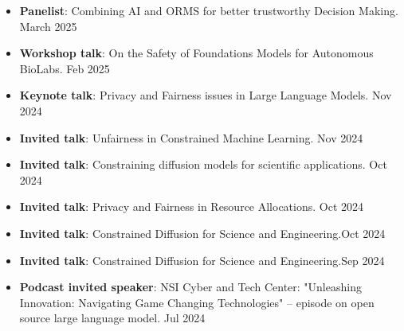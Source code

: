 
\vspace{6pt}
\begin{itemize}
  \item {\bf Panelist}: Combining AI and ORMS for better trustworthy Decision Making.
  \hfill {March 2025}\\

  \item {\bf Workshop talk}: On the Safety of Foundations Models for Autonomous BioLabs.
  \hfill {Feb 2025}\\

  \item {\bf Keynote talk}: Privacy and Fairness issues in Large Language Models.
  \hfill {Nov 2024}\\

  \item {\bf Invited talk}: Unfairness in Constrained Machine Learning.
  \hfill {Nov 2024}\\

  \item {\bf Invited talk}: Constraining diffusion models for scientific applications.
  \hfill {Oct 2024}\\

  \item {\bf Invited talk}: Privacy and Fairness in Resource Allocations. \hfill{Oct 2024}\\

  \item {\bf Invited talk}: Constrained Diffusion for Science and Engineering.\hfill {Oct 2024}\\

  \item {\bf Invited talk}: Constrained Diffusion for Science and Engineering.\hfill {Sep 2024}\\

  \item {\bf Podcast invited speaker}: 
  NSI Cyber and Tech Center: "Unleashing Innovation: Navigating Game Changing Technologies" -- episode on open source large language model.
  \hfill{Jul 2024}\\


\end{itemize}
